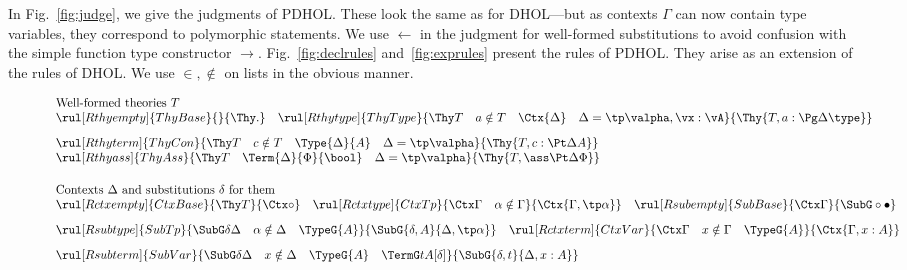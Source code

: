 In Fig.~\ref{fig:judge}, we give the judgments of PDHOL.
These look the same as for DHOL---but as contexts $\Gamma$ can now contain
type variables, they correspond to polymorphic statements.
We use \(\leftarrow\) in the judgment for well-formed substitutions to avoid confusion with the
simple function type constructor \(\rightarrow\).
Fig.~\ref{fig:declrules} and~\ref{fig:exprules}
present the rules of PDHOL.
They arise as an 
extension of the rules of DHOL.
We use \(\in, \notin\) on lists in the obvious manner.
\newcommand{\rtext}[1]{\multicolumn{2}{l}{\text{#1}}}
\begin{figure}[htbp]
  \[\begin{array}{l}
    \text{Well-formed theories $T$}\\
    \rul[Rthyempty]{ThyBase}{}{\Thy .} \quad
    \rul[Rthytype]{ThyType}{\Thy T \quad a\notin T\quad \Ctx{\Delta}            \quad \Delta=\tp\valpha,\vx:\vA}{\Thy{T,a:\Pg\Delta\type}}\\[.3cm]
    \rul[Rthyterm]{ThyCon} {\Thy T \quad c\notin T\quad \Type{\Delta}{A}        \quad
    \Delta=\tp\valpha}        {\Thy{T,c:\Pt\Delta A}} \\ %
    \rul[Rthyass]{ThyAss}   {\Thy T \quad                \Term{\Delta}{\Phi}{\bool} \quad \Delta=\tp\valpha}        {\Thy{T,\ass\Pt\Delta \Phi}}\\[.5cm]
    \text{Contexts $\Delta$ and substitutions $\delta$ for them}\\
    \rul[Rctxempty]{CtxBase}{\Thy T}{\Ctx \circ} \quad
    \rul[Rctxtype]{CtxTp}{\Ctx \Gamma \quad \alpha\notin\Gamma}
    {\Ctx{\Gamma,\tp\alpha}} \quad
    \rul[Rsubempty]{SubBase}{\Ctx \Gamma}{\SubG \circ\bullet} \\[.3cm] %
    \rul[Rsubtype]{SubTp}{\SubG \delta\Delta \quad \alpha\notin\Delta \quad \TypeG{A}}
    {\SubG{\delta,A}         {\Delta,\tp\alpha}} \quad %
    \rul[Rctxterm]{CtxVar} {\Ctx \Gamma \quad x\notin\Gamma \quad \TypeG{A}}
    {\Ctx{\Gamma,x:A}} \\[.3cm] %
    \rul[Rsubterm]{SubVar} {\SubG \delta\Delta \quad x\notin\Delta \quad \TypeG{A}       \quad \TermG t{A[\delta]}}  {\SubG{\delta,t}         {\Delta,x:A}}\\[.3cm]
    

\end{array}\]
\end{figure}
